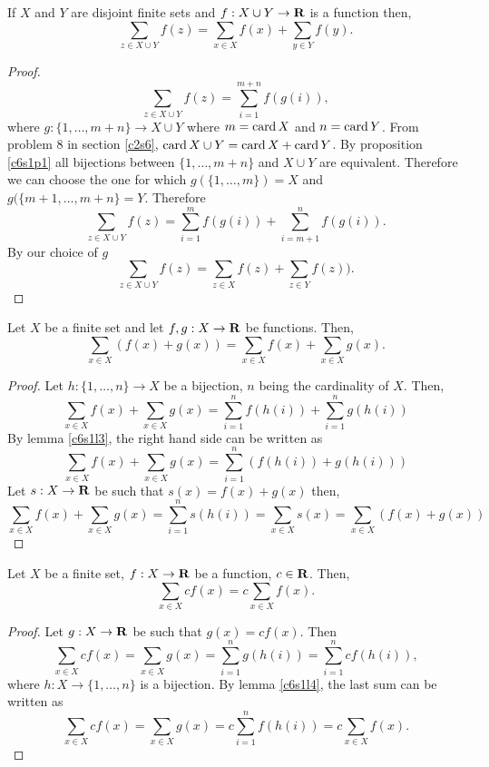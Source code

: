 \begin{lem}\label{c6s1l11}
If $X$ and $Y$ are disjoint finite sets and $f: X \cup Y \rightarrow \mathbf{R}$
is a function then,
\[
\sum_{z \in X \cup Y}f(z) = \sum_{x \in X}f(x) + \sum_{y \in Y}f(y).
\]
\end{lem}
\begin{proof}
\[
\sum_{z \in X \cup Y} f(z) = \sum_{i=1}^{m+n}f(g(i)),
\]
where $g: \{1, \ldots, m + n\} \rightarrow X \cup Y$ where $m = \operatorname{card} X$
and $n = \operatorname{card} Y$. From problem 8 in section \ref{c2s6}, $\operatorname{card}{X \cup Y}
= \operatorname{card}{X} + \operatorname{card}{Y}$. By proposition \ref{c6s1p1} all bijections between
$\{1, \ldots, m + n\}$ and $X \cup Y$  are equivalent. Therefore we can 
choose the one for which $g(\{1, \ldots, m\}) = X$ and $g(\{m+1, \ldots, 
m+n\} = Y$. Therefore
\[
\sum_{z \in X \cup Y}f(z) = \sum_{i=1}^m f(g(i)) + \sum_{i=m+1}^n f(g(i)).
\]
By our choice of $g$
\[
\sum_{z \in X \cup Y}f(z) = \sum_{z \in X}f(z) + \sum_{z \in Y} f(z)).
\]
\end{proof}

\begin{lem}\label{c6s1l12}
Let $X$ be a finite set and let $f, g: X \rightarrow \mathbf{R}$ be functions.
Then,
\[
\sum_{x \in X}(f(x) + g(x)) = \sum_{x \in X}f(x) + \sum_{x \in X}g(x).
\]
\end{lem}
\begin{proof}
Let $h:\{1, \ldots, n\} \rightarrow X$ be a bijection, $n$ being the 
cardinality of $X$. Then,
\[
\sum_{x \in X}f(x) + \sum_{x \in X}g(x) = \sum_{i=1}^nf(h(i)) +
\sum_{i=1}^n g(h(i)) 
\]
By lemma \ref{c6s1l3}, the right hand side can be written as
\[
\sum_{x \in X}f(x) + \sum_{x \in X}g(x) = \sum_{i=1}^n(f(h(i)) + g(h(i)))
\]
Let $s: X \rightarrow \mathbf{R}$ be such that $s(x) = f(x) + g(x)$ then,
\[
\sum_{x \in X}f(x) + \sum_{x \in X}g(x) = \sum_{i=1}^ns(h(i))
= \sum_{x \in X} s(x) = \sum_{x \in X} (f(x) + g(x))
\]
\end{proof}

\begin{lem}\label{c6s1l13}
Let $X$ be a finite set, $f: X \rightarrow \mathbf{R}$ be a function, $c \in \mathbf{R}$.
Then,
\[
\sum_{x \in X} cf(x) = c\sum_{x \in X}f(x).
\]
\end{lem}
\begin{proof}
Let $g: X \rightarrow \mathbf{R}$ be such that $g(x) = cf(x)$. Then
\[
\sum_{x \in X} cf(x) = \sum_{x \in X} g(x) = \sum_{i=1}^ng(h(i))
= \sum_{i=1}^n cf(h(i)),
\]
where $h: X \rightarrow \{1, \ldots, n\}$ is a bijection. By lemma 
\ref{c6s1l4}, the last sum can be written as
\[
\sum_{x \in X} cf(x) = \sum_{x \in X} g(x) = c\sum_{i=1}^n f(h(i)) = 
c\sum_{x \in X} f(x).
\]
\end{proof}

